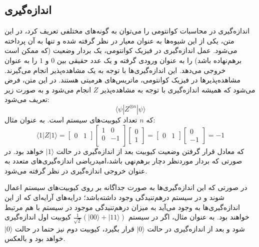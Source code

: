 \subsection{اندازه‌گیری}
اندازه‌گیری در محاسبات کوانتومی را می‌توان به گونه‌های مختلفی تعریف کرد، در این متن، یکی از این شیوه‌ها به عنوان معیار در نظر گرفته شده و تنها به آن پرداخته می‌شود.
عمل اندازه‌گیری در فیزیک کوانتومی، یک بردار وضعیت (که ممکن است برهم‌نهاده باشد) را به عنوان ورودی گرفته و یک عدد حقیقی بین
$0$
و
$1$
را به عنوان خروجی می‌دهد.
این اندازه‌گیری‌ها با توجه به یک مشاهده‌پذیر 
انجام می‌گیرند. مشاهده‌پذیرها در فیزیک کوانتومی، ماتریس‌های هرمیتی
هستند. در این متن، فرض می‌شود که همیشه اندازه‌گیری با توجه به مشاهده‌پذیر 
$Z$
انجام می‌شود و به صورت زیر تعریف می‌شود:
\begin{equation}
    \langle \psi| Z^{\otimes n} | \psi\rangle
\end{equation}
\hsm
که
$n$
تعداد کیوبیت‌های سیستم است. به عنوان مثال:
\begin{equation}
    \langle 1 | Z | 1 \rangle = 
    \begin{bmatrix}
    0 & 1
    \end{bmatrix} 
    \begin{bmatrix}
    1 & 0 \\[3pt]
    0 & -1 \\[3pt]
    \end{bmatrix}
    \begin{bmatrix}
    0 \\[3pt] 1
    \end{bmatrix} 
    = \begin{bmatrix}
    0 & 1
    \end{bmatrix} 
    \begin{bmatrix}
    0 \\[3pt] -1
    \end{bmatrix}
    = -1
\end{equation}
\hsm
که معادل قرار گرفتن وضعیت کیوبیت بعد از اندازه‌گیری در حالت 
$|1\rangle$
خواهد بود. در صورتی که بردار موردنظر دچار برهم‌نهی باشد،امیدریاضی اندازه‌گیری‌های متعدد به عنوان خروجی اندازه‌گیری در نظر گرفته می‌شود.

در صورتی که این اندازه‌گیری‌ها به صورت جداگانه بر روی کیوبیت‌های سیستم اعمال شوند و در سیستم در‌هم‌تنیدگی وجود داشته‌باشد؛ درایه‌های آرایه‌ای که از این اندازه‌گیری‌ها به وجود می‌آید به میزان درهم‌تنیدگی موجود در سیستم با هم مرتبط خواهند بود. به عنوان مثال، اگر در سیستم
$\frac{1}{\sqrt{2}} (|00\rangle + |11\rangle)$
کیوبیت اول اندازه‌گیری شود و بعد از اندازه‌گیری در حالت 
$|0\rangle$
قرار بگیرد، کیوبیت دوم نیز حتما در حالت
$|0\rangle$
خواهد بود و بالعکس.

